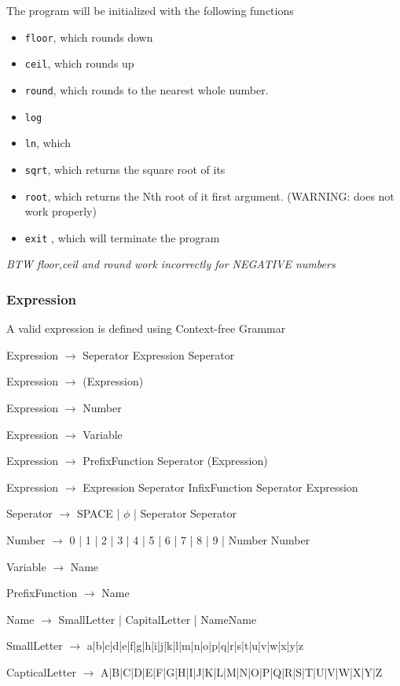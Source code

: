 \documentclass[11pt,a4paper]{article}
\begin{document}
The program will be initialized with the following functions
\begin{itemize}
\item \texttt{floor}, which rounds down
\item \texttt{ceil}, which rounds up
\item \texttt{round}, which rounds to the nearest  whole number.
\item \texttt{log}
\item \texttt{ln}, which
\item \texttt{sqrt}, which returns the square root of its
\item \texttt{root}, which returns the Nth root of it first argument.  (WARNING: does not work properly)
\item \texttt{exit} , which will terminate the program
\end{itemize}



\emph{BTW floor,ceil and round work incorrectly for NEGATIVE numbers}
\subsubsection{Expression}
\label{sec:orgheadline3}
A valid expression is defined using Context-free Grammar

Expression \(\rightarrow\) Seperator Expression Seperator

Expression \(\rightarrow\) (Expression)

Expression \(\rightarrow\) Number

Expression \(\rightarrow\) Variable

Expression \(\rightarrow\) PrefixFunction Seperator (Expression)

Expression \(\rightarrow\) Expression Seperator InfixFunction Seperator Expression

Seperator \(\rightarrow\) SPACE | \(\phi\) | Seperator Seperator

Number \(\rightarrow\) 0 | 1 | 2 | 3 | 4 | 5 | 6 | 7 | 8 | 9 | Number Number

Variable \(\rightarrow\) Name

PrefixFunction \(\rightarrow\) Name

Name \(\rightarrow\) SmallLetter | CapitalLetter | NameName

SmallLetter \(\rightarrow\) a|b|c|d|e|f|g|h|i|j|k|l|m|n|o|p|q|r|s|t|u|v|w|x|y|z

CapticalLetter \(\rightarrow\) A|B|C|D|E|F|G|H|I|J|K|L|M|N|O|P|Q|R|S|T|U|V|W|X|Y|Z
\end{document}
